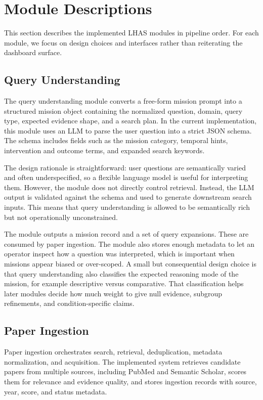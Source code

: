 \documentclass[manuscript,screen,review]{jair}
\begin{document}
\section{Module Descriptions}
This section describes the implemented LHAS modules in pipeline order. For each module, we focus on design choices and interfaces rather than reiterating the dashboard surface.

\subsection{Query Understanding}
The query understanding module converts a free-form mission prompt into a structured mission object containing the normalized question, domain, query type, expected evidence shape, and a search plan. In the current implementation, this module uses an LLM to parse the user question into a strict JSON schema. The schema includes fields such as the mission category, temporal hints, intervention and outcome terms, and expanded search keywords.

The design rationale is straightforward: user questions are semantically varied and often underspecified, so a flexible language model is useful for interpreting them. However, the module does not directly control retrieval. Instead, the LLM output is validated against the schema and used to generate downstream search inputs. This means that query understanding is allowed to be semantically rich but not operationally unconstrained.

The module outputs a mission record and a set of query expansions. These are consumed by paper ingestion. The module also stores enough metadata to let an operator inspect how a question was interpreted, which is important when missions appear biased or over-scoped. A small but consequential design choice is that query understanding also classifies the expected reasoning mode of the mission, for example descriptive versus comparative. That classification helps later modules decide how much weight to give null evidence, subgroup refinements, and condition-specific claims.

\subsection{Paper Ingestion}
Paper ingestion orchestrates search, retrieval, deduplication, metadata normalization, and acquisition. The implemented system retrieves candidate papers from multiple sources, including PubMed and Semantic Scholar, scores them for relevance and evidence quality, and stores ingestion records with source, year, score, and status metadata.
\end{document}

